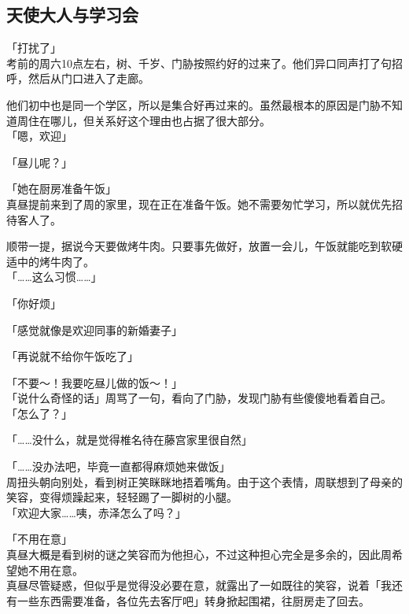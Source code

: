\subsection{天使大人与学习会}

「打扰了」\\

考前的周六10点左右，树、千岁、门胁按照约好的过来了。他们异口同声打了句招呼，然后从门口进入了走廊。

他们初中也是同一个学区，所以是集合好再过来的。虽然最根本的原因是门胁不知道周住在哪儿，但关系好这个理由也占据了很大部分。\\

「嗯，欢迎」

「昼儿呢？」

「她在厨房准备午饭」\\

真昼提前来到了周的家里，现在正在准备午饭。她不需要匆忙学习，所以就优先招待客人了。

顺带一提，据说今天要做烤牛肉。只要事先做好，放置一会儿，午饭就能吃到软硬适中的烤牛肉了。\\

「……这么习惯……」

「你好烦」

「感觉就像是欢迎同事的新婚妻子」

「再说就不给你午饭吃了」

「不要～！我要吃昼儿做的饭～！」\\

「说什么奇怪的话」周骂了一句，看向了门胁，发现门胁有些傻傻地看着自己。\\

「怎么了？」

「……没什么，就是觉得椎名待在藤宫家里很自然」

「……没办法吧，毕竟一直都得麻烦她来做饭」\\

周扭头朝向别处，看到树正笑眯眯地捂着嘴角。由于这个表情，周联想到了母亲的笑容，变得烦躁起来，轻轻踢了一脚树的小腿。\\

「欢迎大家……咦，赤泽怎么了吗？」

「不用在意」\\

真昼大概是看到树的谜之笑容而为他担心，不过这种担心完全是多余的，因此周希望她不用在意。\\

真昼尽管疑惑，但似乎是觉得没必要在意，就露出了一如既往的笑容，说着「我还有一些东西需要准备，各位先去客厅吧」转身掀起围裙，往厨房走了回去。

